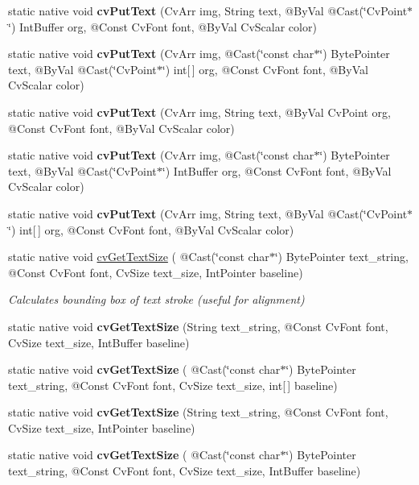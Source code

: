 \begin{DoxyCompactItemize}
static native void {\bfseries cv\+Put\+Text} (Cv\+Arr img, String text, @By\+Val @Cast(\char`\"{}Cv\+Point$\ast$\char`\"{}) Int\+Buffer org, @Const Cv\+Font font, @By\+Val Cv\+Scalar color)
\item 
static native void {\bfseries cv\+Put\+Text} (Cv\+Arr img, @Cast(\char`\"{}const char$\ast$\char`\"{}) Byte\+Pointer text, @By\+Val @Cast(\char`\"{}Cv\+Point$\ast$\char`\"{}) int\mbox{[}$\,$\mbox{]} org, @Const Cv\+Font font, @By\+Val Cv\+Scalar color)
\item 
static native void {\bfseries cv\+Put\+Text} (Cv\+Arr img, String text, @By\+Val Cv\+Point org, @Const Cv\+Font font, @By\+Val Cv\+Scalar color)
\item 
static native void {\bfseries cv\+Put\+Text} (Cv\+Arr img, @Cast(\char`\"{}const char$\ast$\char`\"{}) Byte\+Pointer text, @By\+Val @Cast(\char`\"{}Cv\+Point$\ast$\char`\"{}) Int\+Buffer org, @Const Cv\+Font font, @By\+Val Cv\+Scalar color)
\item 
static native void {\bfseries cv\+Put\+Text} (Cv\+Arr img, String text, @By\+Val @Cast(\char`\"{}Cv\+Point$\ast$\char`\"{}) int\mbox{[}$\,$\mbox{]} org, @Const Cv\+Font font, @By\+Val Cv\+Scalar color)
\item 
static native void \hyperlink{group__imgproc__c_gaadcbbe95eaad71798726cedfd442c08f}{cv\+Get\+Text\+Size} ( @Cast(\char`\"{}const char$\ast$\char`\"{}) Byte\+Pointer text\+\_\+string, @Const Cv\+Font font, Cv\+Size text\+\_\+size, Int\+Pointer baseline)
\begin{DoxyCompactList}\small\item\em Calculates bounding box of text stroke (useful for alignment) \end{DoxyCompactList}\item 
static native void {\bfseries cv\+Get\+Text\+Size} (String text\+\_\+string, @Const Cv\+Font font, Cv\+Size text\+\_\+size, Int\+Buffer baseline)
\item 
static native void {\bfseries cv\+Get\+Text\+Size} ( @Cast(\char`\"{}const char$\ast$\char`\"{}) Byte\+Pointer text\+\_\+string, @Const Cv\+Font font, Cv\+Size text\+\_\+size, int\mbox{[}$\,$\mbox{]} baseline)
\item 
static native void {\bfseries cv\+Get\+Text\+Size} (String text\+\_\+string, @Const Cv\+Font font, Cv\+Size text\+\_\+size, Int\+Pointer baseline)
\item 
static native void {\bfseries cv\+Get\+Text\+Size} ( @Cast(\char`\"{}const char$\ast$\char`\"{}) Byte\+Pointer text\+\_\+string, @Const Cv\+Font font, Cv\+Size text\+\_\+size, Int\+Buffer baseline)

\end{DoxyCompactItemize}
